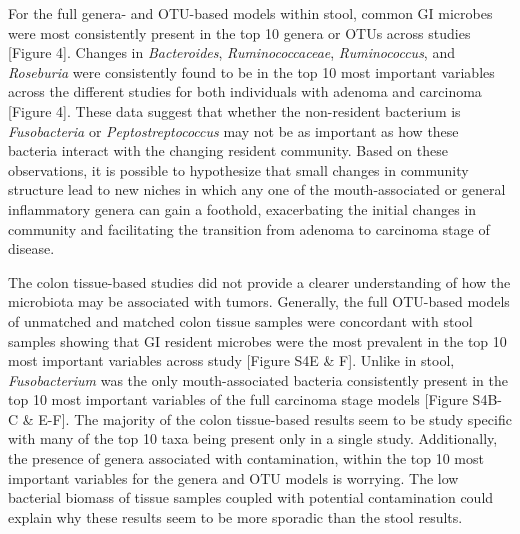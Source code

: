 \documentclass[12pt,]{article}
\begin{document}
For the full genera- and OTU-based models within stool, common GI
microbes were most consistently present in the top 10 genera or OTUs
across studies {[}Figure 4{]}. Changes in \emph{Bacteroides},
\emph{Ruminococcaceae}, \emph{Ruminococcus}, and \emph{Roseburia} were
consistently found to be in the top 10 most important variables across
the different studies for both individuals with adenoma and carcinoma
{[}Figure 4{]}. These data suggest that whether the non-resident
bacterium is \emph{Fusobacteria} or \emph{Peptostreptococcus} may not be
as important as how these bacteria interact with the changing resident
community. Based on these observations, it is possible to hypothesize
that small changes in community structure lead to new niches in which
any one of the mouth-associated or general inflammatory genera can gain
a foothold, exacerbating the initial changes in community and
facilitating the transition from adenoma to carcinoma stage of disease.

The colon tissue-based studies did not provide a clearer understanding
of how the microbiota may be associated with tumors. Generally, the full
OTU-based models of unmatched and matched colon tissue samples were
concordant with stool samples showing that GI resident microbes were the
most prevalent in the top 10 most important variables across study
{[}Figure S4E \& F{]}. Unlike in stool, \emph{Fusobacterium} was the
only mouth-associated bacteria consistently present in the top 10 most
important variables of the full carcinoma stage models {[}Figure S4B-C
\& E-F{]}. The majority of the colon tissue-based results seem to be
study specific with many of the top 10 taxa being present only in a
single study. Additionally, the presence of genera associated with
contamination, within the top 10 most important variables for the genera
and OTU models is worrying. The low bacterial biomass of tissue samples
coupled with potential contamination could explain why these results
seem to be more sporadic than the stool results.
\end{document}
